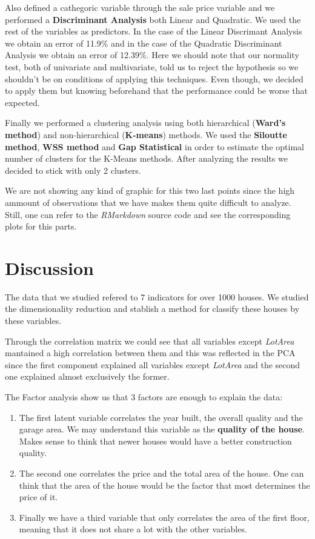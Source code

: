 \documentclass[12pt]{article}
\begin{document}
{    
    Also defined a cathegoric variable through the sale price variable and we performed a \textbf{Discriminant Analysis} both Linear and Quadratic. We used the rest of the variables as predictors. In the case of the Linear Discrimant Analysis we obtain an error of 11.9\% and in the case of the Quadratic Discriminant Analysis we obtain an error of 12.39\%. Here we should note that our normality test, both of univariate and multivariate, told us to reject the hypothesis so we shouldn't be on conditions of applying this techniques. Even though, we decided to apply them but knowing beforehand that the performance could be worse that expected.


    Finally we performed a clustering analysis using both hierarchical (\textbf{Ward's method}) and non-hierarchical (\textbf{K-means}) methods. We used the \textbf{Siloutte method}, \textbf{WSS method} and \textbf{Gap Statistical} in order to estimate the optimal number of clusters for the K-Means methods. After analyzing the results we decided to stick with only 2 clusters.

    We are not showing any kind of graphic for this two last points since the high ammount of observations that we have makes them quite difficult to analyze. Still, one can refer to the \textit{RMarkdown} source code and see the corresponding plots for this parts.
    
\section{Discussion}
The data that we studied refered to 7 indicators for over 1000 houses. We studied the dimensionality reduction and stablish a method for classify these houses by these variables.

Through the correlation matrix we could see that all variables except \textit{LotArea} mantained a high correlation between them and this was reflected in the PCA since the first component explained all variables except \textit{LotArea} and the second one explained almost exclusively the former. 

The Factor analysis show us that 3 factors are enough to explain the data:
\begin{enumerate}
    \item The first latent variable correlates the year built, the overall quality and the garage area. We may understand this variable as the \textbf{quality of the house}. Makes sense to think that newer houses would have a better construction quality.
    \item The second one correlates the price and the total area of the house. One can think that the area of the house would be the factor that most determines the price of it.
    \item Finally we have a third variable that only correlates the area of the first floor, meaning that it does not share a lot with the other variables.
\end{enumerate}

}
\end{document}
